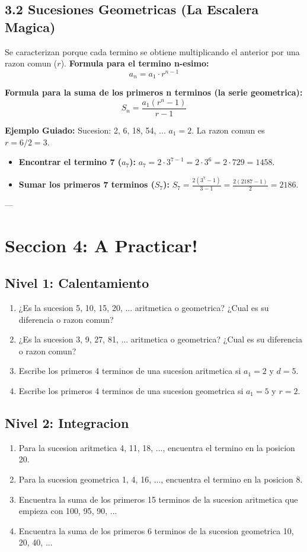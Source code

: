 \documentclass[12pt,a4paper]{article}
\begin{document}
\subsection*{3.2 Sucesiones Geometricas (La Escalera Magica)}
Se caracterizan porque cada termino se obtiene multiplicando el anterior por una razon comun ($r$).
\textbf{Formula para el termino n-esimo:}
$$ a_n = a_1 \cdot r^{n-1} $$

\textbf{Formula para la suma de los primeros n terminos (la serie geometrica):}
$$ S_n = \frac{a_1(r^n - 1)}{r - 1} $$

\textbf{Ejemplo Guiado:}
Sucesion: 2, 6, 18, 54, ...
$a_1 = 2$. La razon comun es $r = 6 / 2 = 3$.
\begin{itemize}
    \item \textbf{Encontrar el termino 7 ($a_7$):}
    $a_7 = 2 \cdot 3^{7-1} = 2 \cdot 3^6 = 2 \cdot 729 = 1458$.
    \item \textbf{Sumar los primeros 7 terminos ($S_7$):}
    $S_7 = \frac{2(3^7 - 1)}{3 - 1} = \frac{2(2187 - 1)}{2} = 2186$.
\end{itemize}

---

\section*{Seccion 4: A Practicar!}

\subsection*{Nivel 1: Calentamiento}
\begin{enumerate}
    \item ¿Es la sucesion 5, 10, 15, 20, ... aritmetica o geometrica? ¿Cual es su diferencia o razon comun?
    \item ¿Es la sucesion 3, 9, 27, 81, ... aritmetica o geometrica? ¿Cual es su diferencia o razon comun?
    \item Escribe los primeros 4 terminos de una sucesion aritmetica si $a_1 = 2$ y $d = 5$.
    \item Escribe los primeros 4 terminos de una sucesion geometrica si $a_1 = 5$ y $r = 2$.
\end{enumerate}

\subsection*{Nivel 2: Integracion}
\begin{enumerate}
    \item Para la sucesion aritmetica 4, 11, 18, ..., encuentra el termino en la posicion 20.
    \item Para la sucesion geometrica 1, 4, 16, ..., encuentra el termino en la posicion 8.
    \item Encuentra la suma de los primeros 15 terminos de la sucesion aritmetica que empieza con 100, 95, 90, ...
    \item Encuentra la suma de los primeros 6 terminos de la sucesion geometrica 10, 20, 40, ...
\end{enumerate}
\end{document}
